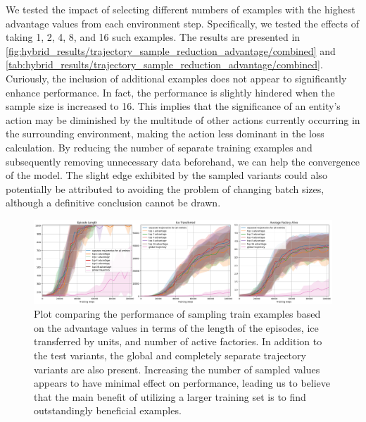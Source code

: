 \noindent We tested the impact of selecting different numbers of examples with the highest advantage values from each environment step. Specifically, we tested the effects of taking 1, 2, 4, 8, and 16 such examples. The results are presented in \autoref{fig:hybrid_results/trajectory_sample_reduction_advantage/combined} and \autoref{tab:hybrid_results/trajectory_sample_reduction_advantage/combined}. Curiously, the inclusion of additional examples does not appear to significantly enhance performance. In fact, the performance is slightly hindered when the sample size is increased to 16. This implies that the significance of an entity's action may be diminished by the multitude of other actions currently occurring in the surrounding environment, making the action less dominant in the loss calculation. By reducing the number of separate training examples and subsequently removing unnecessary data beforehand, we can help the convergence of the model. The slight edge exhibited by the sampled variants could also potentially be attributed to avoiding the problem of changing batch sizes, although a definitive conclusion cannot be drawn.

\begin{figure}[htbp]
    \centering
    \includegraphics[width=1\linewidth]{images/results_hybrid/trajectory_sample_reduction_advantage/combined.png}
    \captionsetup{justification=justified, singlelinecheck=false, width=1\linewidth, labelfont=bf} 
    \caption[]{Plot comparing the performance of sampling train examples based on the advantage values in terms of the length of the episodes, ice transferred by units, and number of active factories. In addition to the test variants, the global and completely separate trajectory variants are also present. Increasing the number of sampled values appears to have minimal effect on performance, leading us to believe that the main benefit of utilizing a larger training set is to find outstandingly beneficial examples.}
    \label{fig:hybrid_results/trajectory_sample_reduction_advantage/combined}
\end{figure}

